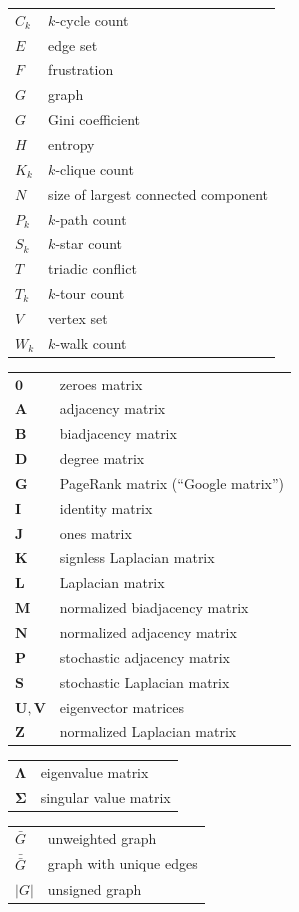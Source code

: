 \documentclass{article}
\begin{document}
\begin{tabular}{ll}
  $C_k$ & $k$-cycle count \\
  $E$ & edge set \\
  $F$ & frustration \\
  $G$ & graph \\
  $G$ & Gini coefficient \\
  $H$ & entropy \\
  $K_k$ & $k$-clique count \\
  $N$   & size of largest connected component\\
  $P_k$ & $k$-path count \\
  $S_k$ & $k$-star count \\
  $T$   & triadic conflict \\
  $T_k$ & $k$-tour count \\
  $V$   & vertex set \\
  $W_k$ & $k$-walk count
\end{tabular}

\begin{tabular}{ll}
  $\mathbf 0$ & zeroes matrix \\
  $\mathbf A$ & adjacency matrix \\
  $\mathbf B$ & biadjacency matrix \\
  $\mathbf D$ & degree matrix \\
  $\mathbf G$ & PageRank matrix (``Google matrix'') \\
  $\mathbf I$ & identity matrix \\
  $\mathbf J$ & ones matrix \\
  $\mathbf K$ & signless Laplacian matrix \\
  $\mathbf L$ & Laplacian matrix \\
  $\mathbf M$ & normalized biadjacency matrix \\
  $\mathbf N$ & normalized adjacency matrix \\
  $\mathbf P$ & stochastic adjacency matrix \\
  $\mathbf S$ & stochastic Laplacian matrix \\
  $\mathbf U, \mathbf V$ & eigenvector matrices \\
  $\mathbf Z$ & normalized Laplacian matrix 
\end{tabular}

\begin{tabular}{ll}
  $\mathbf \Lambda$ & eigenvalue matrix \\
  $\mathbf \Sigma$ & singular value matrix 
\end{tabular}

\begin{tabular}{ll}
  $\bar G$ & unweighted graph \\
  $\bar{\bar G}$ & graph with unique edges \\
  $|G|$ & unsigned graph 
\end{tabular}
\end{document}
